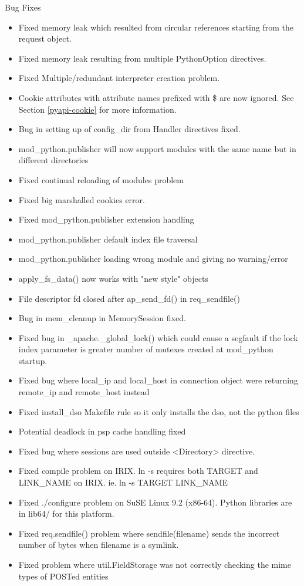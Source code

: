   Bug Fixes

  \begin{itemize}
    \item
      Fixed memory leak which resulted from circular references starting 
      from the request object.
    \item
      Fixed memory leak resulting from multiple PythonOption directives. 
    \item
      Fixed Multiple/redundant interpreter creation problem.
    \item
      Cookie attributes  with attribute names prefixed with 
      \$ are now ignored. See Section \ref{pyapi-cookie} for more 
      information.
    \item
      Bug in setting up of config_dir from Handler directives fixed.
    \item
      mod_python.publisher will now support modules with the same name
      but in different directories
    \item
      Fixed continual reloading of modules problem
    \item
      Fixed big marshalled cookies error.
    \item
      Fixed mod_python.publisher extension handling
    \item
      mod_python.publisher default index file traversal
    \item
      mod_python.publisher loading wrong module and giving no
      warning/error
    \item
      apply_fs_data() now works with "new style" objects
    \item
      File descriptor fd closed after ap_send_fd() in req_sendfile()
    \item
      Bug in mem_cleanup in MemorySession fixed.
    \item
      Fixed bug in _apache._global_lock() which could cause a segfault 
      if the lock index parameter is greater number of mutexes created
      at mod_python startup.
    \item
      Fixed bug where local_ip and local_host in connection object 
      were returning remote_ip and remote_host instead
    \item
      Fixed install_dso Makefile rule so it only installs the dso, not the
      python files
    \item
      Potential deadlock in psp cache handling fixed
    \item
      Fixed bug where sessions are used outside <Directory> directive.
    \item 
      Fixed compile problem on IRIX. ln -s requires both TARGET and LINK_NAME
      on IRIX. ie. ln -s TARGET LINK_NAME
    \item
      Fixed ./configure problem on SuSE Linux 9.2 (x86-64). Python libraries
      are in lib64/ for this platform.
    \item
      Fixed req.sendfile() problem where sendfile(filename) sends the incorrect
      number of bytes when filename is a symlink. 
    \item
      Fixed problem where util.FieldStorage was not correctly checking the mime
      types of POSTed entities
\end{itemize}

